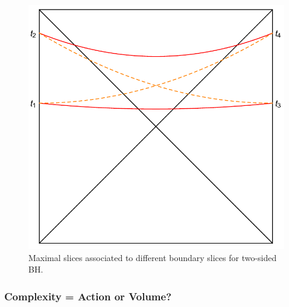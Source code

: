 \documentclass[8pt,aspectratio=169]{beamer}
\begin{document}
\begin{frame}
\begin{minipage}[t]{0.42\linewidth}
\begin{figure}
\begin{center}
        \includegraphics[scale=0.35]{SSA}    
    
    \end{center}
    \caption{Maximal slices associated to different boundary slices for two-sided BH.}
    \label{fig:WDW}
\end{figure}

\end{minipage}

\end{frame}


\begin{frame}
\frametitle{Complexity = Action or Volume?}


\end{frame}
\end{document}
